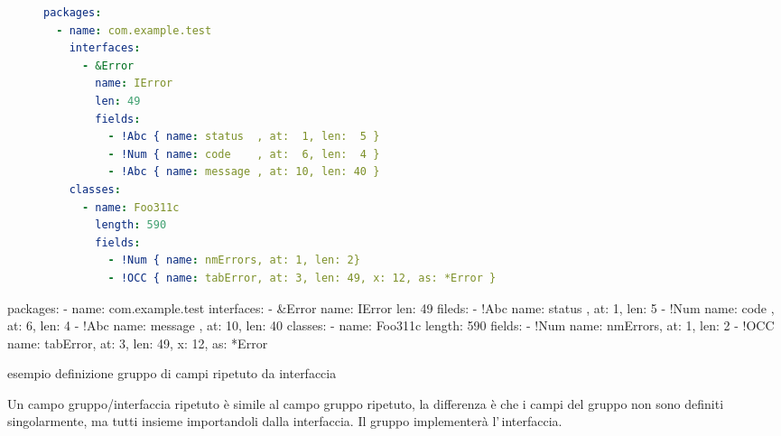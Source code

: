 \ifesource
\begin{figure*}[!htb]
\begin{lstlisting}[language=yaml, 
caption={esempio definizione gruppo di campi ripetuto da interfaccia}, 
label=lst:xmplIOcc]
packages:
  - name: com.example.test
    interfaces:
      - &Error
        name: IError
        len: 49
        fields:
          - !Abc { name: status  , at:  1, len:  5 }
          - !Num { name: code    , at:  6, len:  4 }
          - !Abc { name: message , at: 10, len: 40 }
    classes:
      - name: Foo311c
        length: 590
        fields:
          - !Num { name: nmErrors, at: 1, len: 2}
          - !OCC { name: tabError, at: 3, len: 49, x: 12, as: *Error }
\end{lstlisting}
\end{figure*}
\else
\begin{elisting}[!htb]
\begin{yamlcode}
packages:
  - name: com.example.test
    interfaces:
      - &Error
        name: IError
        len: 49
        fileds:
          - !Abc { name: status  , at:  1, len:  5}
          - !Num { name: code    , at:  6, len:  4}
          - !Abc { name: message , at: 10, len: 40}
    classes:
      - name: Foo311c
        length: 590
        fields:
          - !Num { name: nmErrors, at: 1, len: 2}
          - !OCC { name: tabError, at: 3, len: 49, x: 12, as: *Error }
\end{yamlcode}
\caption{esempio definizione gruppo di campi ripetuto da interfaccia}
\label{lst:xmplIOcc}
\end{elisting}
\fi
Un campo gruppo/interfaccia ripetuto è simile al campo gruppo ripetuto, la 
differenza è che i campi del gruppo non sono definiti singolarmente, ma tutti 
insieme importandoli dalla interfaccia. Il gruppo implementerà l'\,interfaccia.

